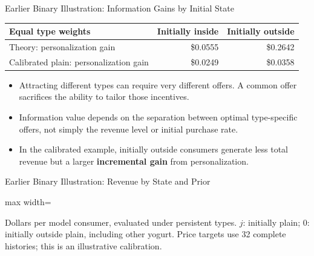 \documentclass[aspectratio=169,professionalfonts]{beamer}
\newcommand{\shortbuttons}{}
\begin{document}
\gdef\shortbuttons{\hyperlink{short-34}{\beamergotobutton{Back to Revised Exercise}}}
\begin{frame}[label=short-57,noframenumbering]{Earlier Binary Illustration: Information Gains by Initial State}
  \begin{center}
    \begin{tabular}{lrr}\toprule
      Equal type weights & Initially inside & Initially outside\\\midrule
      Theory: personalization gain & \$0.0555 & \$0.2642\\
      Calibrated plain: personalization gain & \$0.0249 & \$0.0358\\\bottomrule
    \end{tabular}
  \end{center}
  \begin{itemize}
    \item Attracting different types can require very different offers.
    A common offer sacrifices the ability to tailor those incentives.
    \item Information value depends on the separation between optimal type-specific offers,
    not simply the revenue level or initial purchase rate.
    \item In the calibrated example, initially outside consumers generate less total
    revenue but a larger \textbf{incremental gain} from personalization.
  \end{itemize}
\end{frame}

\gdef\shortbuttons{\hyperlink{short-34}{\beamergotobutton{Back to Revised Exercise}}}
\begin{frame}[label=short-plain-info-table,noframenumbering]{Earlier Binary Illustration: Revenue by State and Prior}
  \centering\small
  \begin{adjustbox}{max width=\linewidth}
    
  \end{adjustbox}
  \par\medskip\footnotesize Dollars per model consumer, evaluated under persistent types.
  $j$: initially plain; $0$: initially outside plain, including other yogurt.
  Price targets use 32 complete histories; this is an illustrative calibration.
\end{frame}
\end{document}
